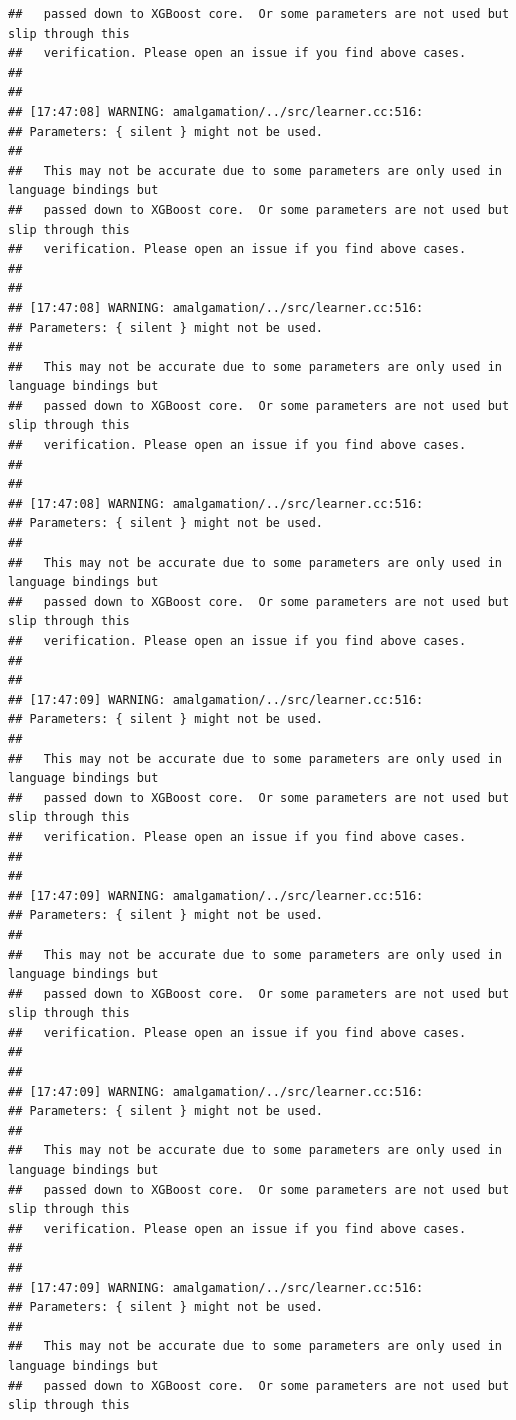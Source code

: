\documentclass[AMS,STIX2COL]{WileyNJD-v2}\usepackage[]{graphicx}\usepackage[]{color}
\makeatletter
\newenvironment{kframe}{%
 \def\at@end@of@kframe{}%
 \ifinner\ifhmode%
  \def\at@end@of@kframe{\end{minipage}}%
  \begin{minipage}{\columnwidth}%
 \fi\fi%
 \def\FrameCommand##1{\hskip\@totalleftmargin \hskip-\fboxsep
 \colorbox{shadecolor}{##1}\hskip-\fboxsep
     \hskip-\linewidth \hskip-\@totalleftmargin \hskip\columnwidth}%
 \MakeFramed {\advance\hsize-\width
   \@totalleftmargin\z@ \linewidth\hsize
   \@setminipage}}%
 {\par\unskip\endMakeFramed%
 \at@end@of@kframe}
\newenvironment{knitrout}{}{} %
\makeatother
\begin{document}
\begin{knitrout}
\begin{kframe}
\begin{verbatim}
##   passed down to XGBoost core.  Or some parameters are not used but slip through this
##   verification. Please open an issue if you find above cases.
## 
## 
## [17:47:08] WARNING: amalgamation/../src/learner.cc:516: 
## Parameters: { silent } might not be used.
## 
##   This may not be accurate due to some parameters are only used in language bindings but
##   passed down to XGBoost core.  Or some parameters are not used but slip through this
##   verification. Please open an issue if you find above cases.
## 
## 
## [17:47:08] WARNING: amalgamation/../src/learner.cc:516: 
## Parameters: { silent } might not be used.
## 
##   This may not be accurate due to some parameters are only used in language bindings but
##   passed down to XGBoost core.  Or some parameters are not used but slip through this
##   verification. Please open an issue if you find above cases.
## 
## 
## [17:47:08] WARNING: amalgamation/../src/learner.cc:516: 
## Parameters: { silent } might not be used.
## 
##   This may not be accurate due to some parameters are only used in language bindings but
##   passed down to XGBoost core.  Or some parameters are not used but slip through this
##   verification. Please open an issue if you find above cases.
## 
## 
## [17:47:09] WARNING: amalgamation/../src/learner.cc:516: 
## Parameters: { silent } might not be used.
## 
##   This may not be accurate due to some parameters are only used in language bindings but
##   passed down to XGBoost core.  Or some parameters are not used but slip through this
##   verification. Please open an issue if you find above cases.
## 
## 
## [17:47:09] WARNING: amalgamation/../src/learner.cc:516: 
## Parameters: { silent } might not be used.
## 
##   This may not be accurate due to some parameters are only used in language bindings but
##   passed down to XGBoost core.  Or some parameters are not used but slip through this
##   verification. Please open an issue if you find above cases.
## 
## 
## [17:47:09] WARNING: amalgamation/../src/learner.cc:516: 
## Parameters: { silent } might not be used.
## 
##   This may not be accurate due to some parameters are only used in language bindings but
##   passed down to XGBoost core.  Or some parameters are not used but slip through this
##   verification. Please open an issue if you find above cases.
## 
## 
## [17:47:09] WARNING: amalgamation/../src/learner.cc:516: 
## Parameters: { silent } might not be used.
## 
##   This may not be accurate due to some parameters are only used in language bindings but
##   passed down to XGBoost core.  Or some parameters are not used but slip through this

\end{verbatim}
\end{kframe}
\end{knitrout}
\end{document}
